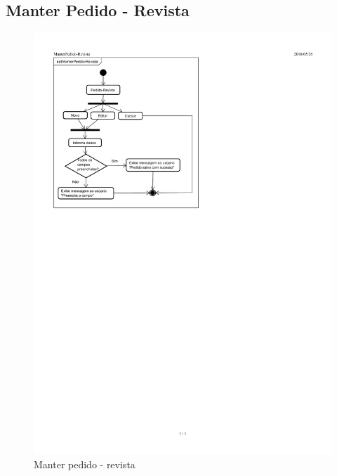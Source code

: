 \documentclass[chapter=TITLE,12pt,oneside,a4paper,english,french,sumario=tradicional,spanish,brazil,]{abntex2}
\begin{document}
\subsection{Manter Pedido - Revista}
\begin{figure}[h]\centering
	\includegraphics[scale=1.67]{pedido-revista.pdf}\caption{Manter pedido - revista}
\end{figure}

\newpage
\end{document}
